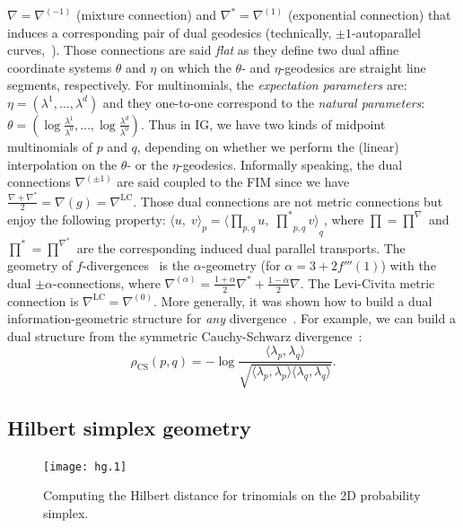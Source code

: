 \documentclass[graybox]{svmult}
\def\CS{\mathrm{CS}}
\def\LC{\mathrm{LC}}
\def\Finner#1#2#3{{\langle {#1},\;{#2} \rangle}_{#3}}
\def\inner#1#2{ \langle {#1},{#2} \rangle }
\begin{document}
$\nabla=\nabla^{(-1)}$ (mixture connection) and $\nabla^*=\nabla^{(1)}$ (exponential connection) that induces a corresponding pair of dual geodesics
(technically, $\pm1$-autoparallel curves,~\cite{IG-2014}). Those connections are said \emph{flat} as they define two dual affine
coordinate systems $\theta$ and $\eta$ on which the $\theta$- and $\eta$-geodesics are straight line segments, respectively. 
For multinomials, the {\em expectation parameters} are: $\eta = (\lambda^1,\ldots,\lambda^d)$
and they one-to-one correspond to the {\em natural parameters}:
$\theta = \left(\log\frac{\lambda^1}{\lambda^0},\ldots,\log\frac{\lambda^d}{\lambda^0}\right)$.
Thus in IG, we have two kinds of midpoint multinomials of $p$ and $q$, depending on whether we perform the (linear) interpolation
on the $\theta$- or the $\eta$-geodesics.
Informally speaking, the dual connections $\nabla^{(\pm 1)}$ are said coupled to the FIM since we have  
$\frac{\nabla+\nabla^*}{2}=\nabla(g)=\nabla^{\LC}$. Those dual connections are not metric connections but enjoy the following property:
$\Finner{u}{v}{p} = \Finner{{\prod}_{p,q} u}{{\prod^*}_{p,q} v}{q}$, where $\prod=\prod^{\nabla}$ and ${\prod^*}={\prod^{\nabla^*}}$
are the corresponding induced dual parallel transports.
The geometry of $f$-divergences~\cite{DivIG-2010} is the $\alpha$-geometry (for $\alpha=3+2f'''(1)$) with the dual $\pm\alpha$-connections,
where $\nabla^{(\alpha)}=\frac{1+\alpha}{2}\nabla^*+\frac{1-\alpha}{2}\nabla$. The Levi-Civita metric connection is $\nabla^\LC=\nabla^{(0)}$.
More generally, it was shown how to build a dual information-geometric structure for {\em any} divergence~\cite{DivIG-2010}.
For example, we can build a dual structure from the symmetric Cauchy-Schwarz divergence~\cite{CS-2006}:
\begin{equation}
\rho_\CS(p,q)=- \log \frac{\inner{\lambda_p}{\lambda_q}}{\sqrt{\inner{\lambda_p}{\lambda_p}\inner{\lambda_q}{\lambda_q}}}.
\end{equation}

\subsection{Hilbert simplex geometry}

\begin{figure}%
\centering%
\texttt{[image: hg.1]}%
\caption{Computing the Hilbert distance for trinomials on the 2D probability simplex.}%
\label{fig:hd}%
\end{figure}
\end{document}

